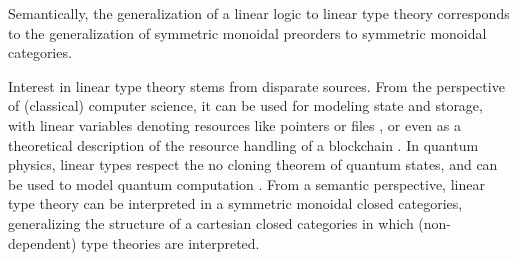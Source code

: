 Semantically, the generalization of a linear logic to linear type theory corresponds to the generalization of symmetric monoidal preorders to symmetric monoidal categories.


Interest in linear type theory stems from disparate sources. From the perspective of (classical) computer science, it can be used for modeling state and storage, with linear variables denoting resources like pointers or files \cite{krishnaswami}, or even as a theoretical description of the resource handling of a blockchain \cite{meredith2015linear}. In quantum physics, linear types respect the no cloning theorem of quantum states, and can be used to model quantum computation \cite{duncan2006types}. From a semantic perspective, linear type theory can be interpreted in a symmetric monoidal closed categories, generalizing the structure of a cartesian closed categories in which (non-dependent) type theories are interpreted.


